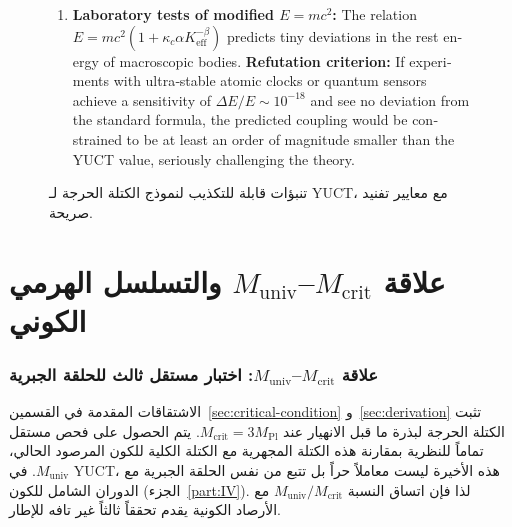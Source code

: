 \documentclass[12pt,a4paper]{article}
\begin{document}
\begin{otherlanguage}{english}
\begin{figure}[!ht]
{\begin{minipage}{0.95\textwidth}
\begin{enumerate}
\[						\]
						hence \(f_{\mathrm{NL}}^{\mathrm{local}} = \frac{5}{3}\beta \approx 1.12\). This is a robust, non‑zero prediction, distinguishable from standard slow‑roll inflation (\(f_{\mathrm{NL}} \ll 1\)). \textbf{Refutation criterion:} If future surveys (Euclid, SPHEREx) measure \(f_{\mathrm{NL}}^{\mathrm{local}} < 0.5\) or \(> 1.8\) at \(>3\sigma\) significance, the theory is falsified.
						\item \textbf{Laboratory tests of modified \(E=mc^2\):} The relation \(E = m c^2 (1 + \kappa_c \alpha K_{\mathrm{eff}}^{-\beta})\) predicts tiny deviations in the rest energy of macroscopic bodies. \textbf{Refutation criterion:} If experiments with ultra‑stable atomic clocks or quantum sensors achieve a sensitivity of \(\Delta E / E \sim 10^{-18}\) and see no deviation from the standard formula, the predicted coupling would be constrained to be at least an order of magnitude smaller than the YUCT value, seriously challenging the theory.
					\end{enumerate}
					\vspace{1em}
			\end{minipage}}
			\caption{تنبؤات قابلة للتكذيب لنموذج الكتلة الحرجة لـ YUCT، مع معايير تفنيد صريحة.}
			\label{fig:predictions}
		\end{figure}
	\end{otherlanguage}
	
	\part{علاقة \(M_{\mathrm{crit}}\)–\(M_{\mathrm{univ}}\) والتسلسل الهرمي الكوني}
	\label{part:II}
	
	\section{علاقة \(M_{\mathrm{crit}}\)–\(M_{\mathrm{univ}}\): اختبار مستقل ثالث للحلقة الجبرية}
	\label{sec:third-test}
	
	الاشتقاقات المقدمة في القسمين~\ref{sec:critical-condition} و~\ref{sec:derivation} تثبت الكتلة الحرجة لبذرة ما قبل الانهيار عند \(M_{\mathrm{crit}} = 3 M_{\mathrm{Pl}}\). يتم الحصول على فحص مستقل تماماً للنظرية بمقارنة هذه الكتلة المجهرية مع الكتلة الكلية للكون المرصود الحالي، \(M_{\mathrm{univ}}\). في YUCT، هذه الأخيرة ليست معاملاً حراً بل تتبع من نفس الحلقة الجبرية مع الدوران الشامل للكون (الجزء~\ref{part:IV}). لذا فإن اتساق النسبة \(M_{\mathrm{univ}} / M_{\mathrm{crit}}\) مع الأرصاد الكونية يقدم تحققاً ثالثاً غير تافه للإطار.
	
\end{document}
